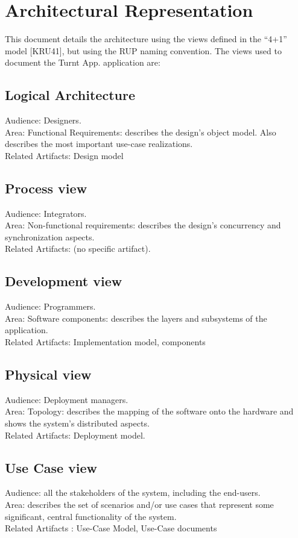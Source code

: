 \documentclass[10pt,a4paper]{article}
\begin{document}
\section{Architectural Representation }
This document details the architecture using the views defined in the “4+1” model [KRU41], but using the 	RUP naming convention. The views used to document the Turnt App. application are:
\subsection{Logical Architecture}

Audience: Designers.\\
Area: Functional Requirements: describes the design's object model. Also describes the most important use-case realizations.\\
Related Artifacts: Design model\\

\subsection{Process view}
Audience: Integrators.\\
Area: Non-functional requirements: describes the design's concurrency and synchronization aspects.\\
Related Artifacts: (no specific artifact).\\


\subsection{Development view }
Audience: Programmers.\\
Area: Software components: describes the layers and subsystems of the application.\\
Related Artifacts: Implementation model, components\\

\subsection{Physical view} 
Audience: Deployment managers.\\
Area: Topology: describes the mapping of the software onto the hardware and shows the system's distributed aspects.\\
Related Artifacts: Deployment model.\\

\subsection{Use Case view}
Audience: all the stakeholders of the system, including the end-users.\\
Area: describes the set of scenarios and/or use cases that represent some significant, central functionality of the system.\\
Related Artifacts : Use-Case Model, Use-Case documents\\
\end{document}
